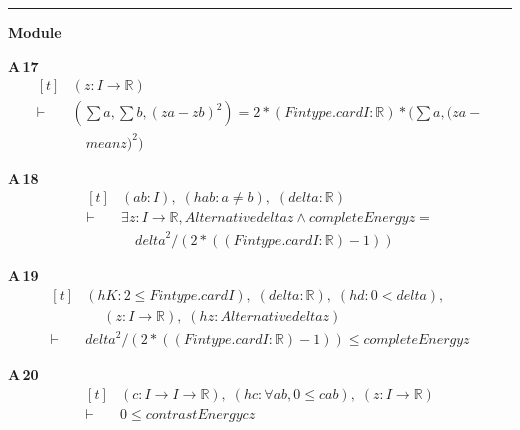 \vspace{4pt}\noindent\rule{\columnwidth}{0.4pt}\par\vspace{2pt}
\noindent\textbf{Module }\par\vspace{3pt}

\noindent\textbf{A\,17}\quad{}
{\footnotesize\[ \begin{aligned}[t]
&(\mathit{z} : \mathit{I} \to \mathbb{R} )\\
\vdash\;&(\textstyle\sum \mathit{a},\textstyle\sum \mathit{b},(\mathit{z} \mathit{a}-\mathit{z} \mathit{b})^{2})=2*(\mathit{Fintype}.\mathit{card} \mathit{I}:\mathbb{R} )*(\textstyle\sum \mathit{a},(\mathit{z} \mathit{a}-\\
&\quad \mathit{mean} \mathit{z})^{2})
\end{aligned} \]}

\noindent\textbf{A\,18}\quad{}
{\footnotesize\[ \begin{aligned}[t]
&(\mathit{a} \mathit{b} : \mathit{I}),\; (\mathit{hab} : \mathit{a} \neq \mathit{b}),\; (\mathit{delta} : \mathbb{R} )\\
\vdash\;&\exists \mathit{z} : \mathit{I} \to \mathbb{R} ,\mathit{Alternative} \mathit{delta} \mathit{z} \wedge \mathit{completeEnergy} \mathit{z}=\\
&\quad \mathit{delta}^{2}/(2*((\mathit{Fintype}.\mathit{card} \mathit{I}:\mathbb{R} )-1))
\end{aligned} \]}

\noindent\textbf{A\,19}\quad{}
{\footnotesize\[ \begin{aligned}[t]
&(\mathit{hK} : 2 \leq \mathit{Fintype}.\mathit{card} \mathit{I}),\; (\mathit{delta} : \mathbb{R} ),\; (\mathit{hd} : 0 < \mathit{delta}),\\
&\quad \; (\mathit{z} : \mathit{I} \to \mathbb{R} ),\; (\mathit{hz} : \mathit{Alternative} \mathit{delta} \mathit{z})\\
\vdash\;&\mathit{delta}^{2}/(2*((\mathit{Fintype}.\mathit{card} \mathit{I}:\mathbb{R} )-1)) \leq \mathit{completeEnergy} \mathit{z}
\end{aligned} \]}

\noindent\textbf{A\,20}\quad{}
{\footnotesize\[ \begin{aligned}[t]
&(\mathit{c} : \mathit{I} \to \mathit{I} \to \mathbb{R} ),\; (\mathit{hc} : \forall \mathit{a} \mathit{b},0 \leq \mathit{c} \mathit{a} \mathit{b}),\; (\mathit{z} : \mathit{I} \to \mathbb{R} )\\
\vdash\;&0 \leq \mathit{contrastEnergy} \mathit{c} \mathit{z}
\end{aligned} \]}


